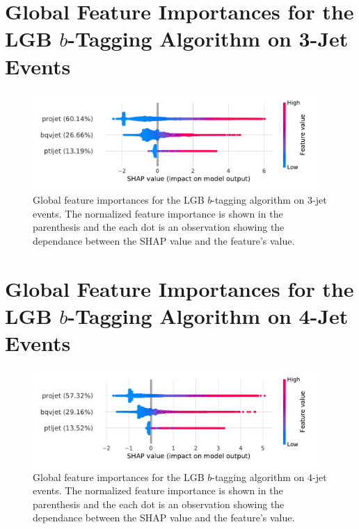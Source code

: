 \FloatBarrier
\section[Global Feature Importances for the LGB b-Tagging Algorithm on 3-Jet Events]{Global Feature Importances for the LGB $b$-Tagging Algorithm on 3-Jet Events}
\begin{figure}[h!]
  \includegraphics[width=0.98\textwidth, trim=10 10 20 10, clip]{figures/quarks/shap_global-down_sample=1.00-ML_vars=vertex-selection=b-ejet_min=4-n_iter_RS_lgb=99-n_iter_RS_xgb=9-cdot_cut=0.90-version=19-njet=3.pdf}
  \caption[Global Feature Importances for the LGB $b$-Tagging Algorithm on 3-Jet Events]
          {Global feature importances for the LGB $b$-tagging algorithm on 3-jet events. The normalized feature importance is shown in the parenthesis and the each dot is an observation showing the dependance between the SHAP value and the feature's value. 
          } 
  \label{fig:q:shap_btag_global_3j}
\end{figure}
\vspace{3cm}
\section[Global Feature Importances for the LGB b-Tagging Algorithm on 4-Jet Events]{Global Feature Importances for the LGB $b$-Tagging Algorithm on 4-Jet Events}
\begin{figure}[h!]
  \includegraphics[width=0.98\textwidth, trim=10 10 20 10, clip]{figures/quarks/shap_global-down_sample=1.00-ML_vars=vertex-selection=b-ejet_min=4-n_iter_RS_lgb=99-n_iter_RS_xgb=9-cdot_cut=0.90-version=19-njet=4.pdf}
  \caption[Global Feature Importances for the LGB $b$-Tagging Algorithm on 4-Jet Events]
          {Global feature importances for the LGB $b$-tagging algorithm on 4-jet events. The normalized feature importance is shown in the parenthesis and the each dot is an observation showing the dependance between the SHAP value and the feature's value. 
          } 
\end{figure}
\clearpage






